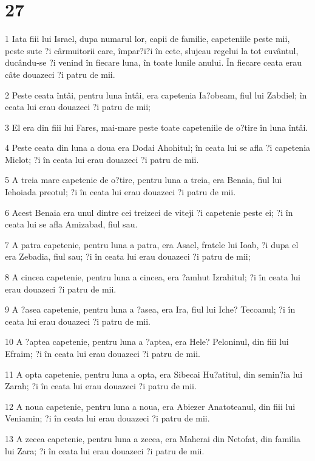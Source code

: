 \chapter{27}

\par 1 Iata fiii lui Israel, dupa numarul lor, capii de familie, capeteniile peste mii, peste sute ?i cârmuitorii care, împar?i?i în cete, slujeau regelui la tot cuvântul, ducându-se ?i venind în fiecare luna, în toate lunile anului. În fiecare ceata erau câte douazeci ?i patru de mii.
\par 2 Peste ceata întâi, pentru luna întâi, era capetenia Ia?obeam, fiul lui Zabdiel; în ceata lui erau douazeci ?i patru de mii;
\par 3 El era din fiii lui Fares, mai-mare peste toate capeteniile de o?tire în luna întâi.
\par 4 Peste ceata din luna a doua era Dodai Ahohitul; în ceata lui se afla ?i capetenia Miclot; ?i în ceata lui erau douazeci ?i patru de mii.
\par 5 A treia mare capetenie de o?tire, pentru luna a treia, era Benaia, fiul lui Iehoiada preotul; ?i în ceata lui erau douazeci ?i patru de mii.
\par 6 Acest Benaia era unul dintre cei treizeci de viteji ?i capetenie peste ei; ?i în ceata lui se afla Amizabad, fiul sau.
\par 7 A patra capetenie, pentru luna a patra, era Asael, fratele lui Ioab, ?i dupa el era Zebadia, fiul sau; ?i în ceata lui erau douazeci ?i patru de mii;
\par 8 A cincea capetenie, pentru luna a cincea, era ?amhut Izrahitul; ?i în ceata lui erau douazeci ?i patru de mii.
\par 9 A ?asea capetenie, pentru luna a ?asea, era Ira, fiul lui Iche? Tecoanul; ?i în ceata lui erau douazeci ?i patru de mii.
\par 10 A ?aptea capetenie, pentru luna a ?aptea, era Hele? Peloninul, din fiii lui Efraim; ?i în ceata lui erau douazeci ?i patru de mii.
\par 11 A opta capetenie, pentru luna a opta, era Sibecai Hu?atitul, din semin?ia lui Zarah; ?i în ceata lui erau douazeci ?i patru de mii.
\par 12 A noua capetenie, pentru luna a noua, era Abiezer Anatoteanul, din fiii lui Veniamin; ?i în ceata lui erau douazeci ?i patru de mii.
\par 13 A zecea capetenie, pentru luna a zecea, era Maherai din Netofat, din familia lui Zara; ?i în ceata lui erau douazeci ?i patru de mii.
